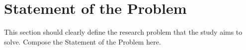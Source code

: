 \section{Statement of the Problem}

This section should clearly define the research problem that the study aims to solve. Compose the Statement of the Problem here.